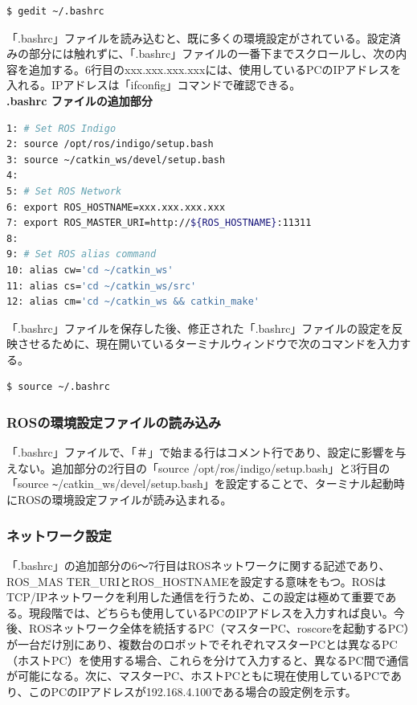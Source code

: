 \begin{lstlisting}[language=ROS]
$ gedit ~/.bashrc
\end{lstlisting}

「.bashrc」ファイルを読み込むと、既に多くの環境設定がされている。設定済みの部分には触れずに、「.bashrc」ファイルの一番下までスクロールし、次の内容を追加する。6行目のxxx.xxx.xxx.xxxには、使用しているPCのIPアドレスを入れる。IPアドレスは「ifconfig」コマンドで確認できる。\\

\noindent\textbf{.bashrc ファイルの追加部分}
\begin{lstlisting}[language=bash]
1: # Set ROS Indigo
2: source /opt/ros/indigo/setup.bash
3: source ~/catkin_ws/devel/setup.bash
4:
5: # Set ROS Network
6: export ROS_HOSTNAME=xxx.xxx.xxx.xxx
7: export ROS_MASTER_URI=http://${ROS_HOSTNAME}:11311
8:
9: # Set ROS alias command
10: alias cw='cd ~/catkin_ws'
11: alias cs='cd ~/catkin_ws/src'
12: alias cm='cd ~/catkin_ws && catkin_make'
\end{lstlisting}

「.bashrc」ファイルを保存した後、修正された「.bashrc」ファイルの設定を反映させるために、現在開いているターミナルウィンドウで次のコマンドを入力する。

\begin{lstlisting}[language=bash]
$ source ~/.bashrc
\end{lstlisting}

\subsubsection{ROSの環境設定ファイルの読み込み}

「.bashrc」ファイルで、「＃」で始まる行はコメント行であり、設定に影響を与えない。追加部分の2行目の「source /opt/ros/indigo/setup.bash」と3行目の「source \verb|~|/catkin\_ws/devel/setup.bash」を設定することで、ターミナル起動時にROSの環境設定ファイルが読み込まれる。

\subsubsection{ネットワーク設定}

「.bashrc」の追加部分の6～7行目はROSネットワークに関する記述であり、ROS\_MAS TER\_URIとROS\_HOSTNAMEを設定する意味をもつ。ROSはTCP/IPネットワークを利用した通信を行うため、この設定は極めて重要である。現段階では、どちらも使用しているPCのIPアドレスを入力すれば良い。今後、ROSネットワーク全体を統括するPC（マスターPC、roscoreを起動するPC）が一台だけ別にあり、複数台のロボットでそれぞれマスターPCとは異なるPC（ホストPC）を使用する場合、これらを分けて入力すると、異なるPC間で通信が可能になる。次に、マスターPC、ホストPCともに現在使用しているPCであり、このPCのIPアドレスが192.168.4.100である場合の設定例を示す。


